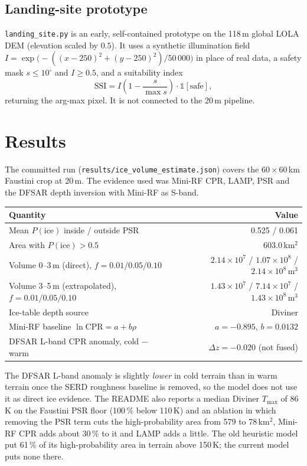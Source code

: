 \documentclass[11pt,a4paper]{article}
\newcommand{\code}[1]{\texttt{#1}}
\newcommand{\Pice}{P(\text{ice})}
\begin{document}
\subsection{Landing-site prototype}
\code{landing\_site.py} is an early, self-contained prototype on the 118\,m global LOLA DEM
(elevation scaled by $0.5$). It uses a synthetic illumination field
$I=\exp\!\big(-((x-250)^2+(y-250)^2)/50\,000\big)$ in place of real data, a safety mask
$s\le10^\circ$ and $I\ge0.5$, and a suitability index
\begin{equation}
  \mathrm{SSI} = I\left(1-\frac{s}{\max s}\right)\cdot\mathbb{1}[\text{safe}],
\end{equation}
returning the arg-max pixel. It is not connected to the 20\,m pipeline.

\section{Results}

The committed run (\code{results/ice\_volume\_estimate.json}) covers the $60\times60$\,km Faustini
crop at 20\,m. The evidence used was Mini-RF CPR, LAMP, PSR and the DFSAR depth inversion with
Mini-RF as S-band.

\begin{center}
\begin{tabularx}{\linewidth}{@{}Xr@{}}
\toprule
Quantity & Value \\
\midrule
Mean $\Pice$ inside / outside PSR & 0.525 / 0.061 \\
Area with $\Pice>0.5$ & 603.0\,km$^2$ \\
Volume 0--3\,m (direct), $f=0.01/0.05/0.10$ & $2.14\times10^7$ / $1.07\times10^8$ / $2.14\times10^8$\,m$^3$ \\
Volume 3--5\,m (extrapolated), $f=0.01/0.05/0.10$ & $1.43\times10^7$ / $7.14\times10^7$ / $1.43\times10^8$\,m$^3$ \\
Ice-table depth source & Diviner \\
Mini-RF baseline $\ln\mathrm{CPR}=a+b\rho$ & $a=-0.895$, $b=0.0132$ \\
DFSAR L-band CPR anomaly, cold $-$ warm & $\Delta z=-0.020$ (not fused) \\
\bottomrule
\end{tabularx}
\end{center}

The DFSAR L-band anomaly is slightly \emph{lower} in cold terrain than in warm terrain once the
SERD roughness baseline is removed, so the model does not use it as direct ice evidence. The
README also reports a median Diviner $T_{\max}$ of 86\,K on the Faustini PSR floor (100\,\% below
110\,K) and an ablation in which removing the PSR term cuts the high-probability area from 579 to
78\,km$^2$, Mini-RF CPR adds about 30\,\% to it and LAMP adds a little. The old heuristic model
put 61\,\% of its high-probability area in terrain above 150\,K; the current model puts none
there.
\end{document}
